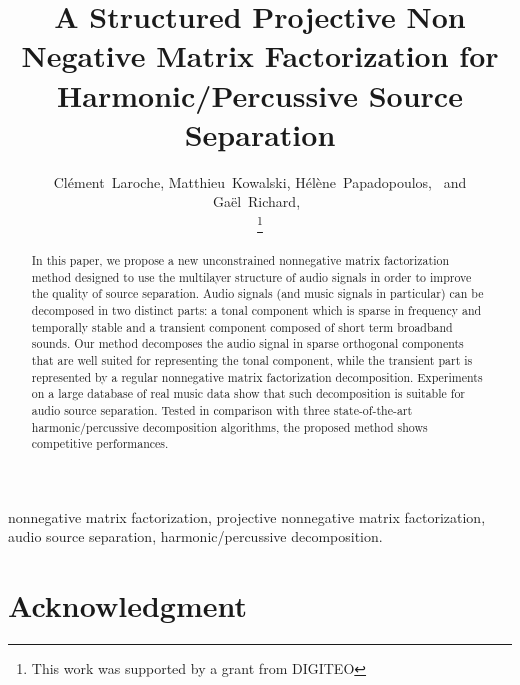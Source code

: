 \documentclass[journal]{IEEEtran}
\begin{document}
\title{A Structured Projective Non Negative Matrix Factorization for Harmonic/Percussive Source Separation}

\author{Cl\'{e}ment~Laroche,
        Matthieu~Kowalski,
        H\'{e}l\`{e}ne~Papadopoulos,~
        and Ga\"{el}~Richard,~%
        
\thanks{This work was supported by a grant from DIGITEO}}



\maketitle


\begin{abstract}
In this paper, we propose a new unconstrained nonnegative matrix factorization method designed to use the multilayer structure of audio signals in order to improve the quality of source separation. Audio signals (and music signals in particular) can be decomposed in two distinct parts: a tonal component which is sparse in frequency and temporally stable and a transient component composed of short term broadband sounds. Our method decomposes the audio signal in sparse orthogonal components that are well suited for representing the tonal component, while the transient part is represented by a regular nonnegative matrix factorization decomposition. Experiments on a large database of real music data show that such decomposition is suitable for audio source separation. Tested in comparison with three state-of-the-art harmonic/percussive decomposition algorithms, the proposed method shows competitive performances.
\end{abstract}


\begin{IEEEkeywords}
nonnegative matrix factorization, projective nonnegative matrix factorization, audio source separation, harmonic/percussive decomposition.
\end{IEEEkeywords}

















\section*{Acknowledgment}






\end{document}

